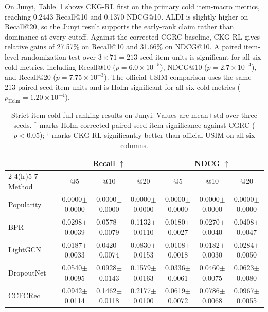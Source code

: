 \documentclass[sigconf,anonymous,review]{acmart}
\newcommand{\sd}[1]{{\footnotesize$\pm$#1}}
\begin{document}
On Junyi, Table~\ref{tab:junyi-cold} shows CKG-RL first on the primary cold item-macro metrics, reaching 0.2443 Recall@10 and 0.1370 NDCG@10. ALDI is slightly higher on Recall@20, so the Junyi result supports the early-rank claim rather than dominance at every cutoff. Against the corrected CGRC baseline, CKG-RL gives relative gains of 27.57\% on Recall@10 and 31.66\% on NDCG@10. A paired item-level randomization test over \(3\times 71=213\) seed-item units is significant for all six cold metrics, including Recall@10 (\(p=6.0{\times}10^{-5}\)), NDCG@10 (\(p=2.7{\times}10^{-4}\)), and Recall@20 (\(p=7.75{\times}10^{-3}\)). The official-USIM comparison uses the same 213 paired seed-item units and is Holm-significant for all six cold metrics (\(p_{\mathrm{Holm}}=1.20{\times}10^{-4}\)).

\begin{table}[t]
\centering
\caption{Strict item-cold full-ranking results on Junyi. Values are mean\(\pm\)std over three seeds. \(^{*}\) marks Holm-corrected paired seed-item significance against CGRC (\(p<0.05\)); \(^{\dagger}\) marks CKG-RL significantly better than official USIM on all six columns.}
\label{tab:junyi-cold}
\small
\setlength{\tabcolsep}{2.8pt}
\renewcommand{\arraystretch}{1.10}
\begin{tabular*}{\textwidth}{@{\extracolsep{\fill}}lcccccc}
\toprule
& \multicolumn{3}{c}{Recall \(\uparrow\)} & \multicolumn{3}{c}{NDCG \(\uparrow\)} \\
\cmidrule(lr){2-4}\cmidrule(lr){5-7}
Method & \multicolumn{1}{c}{@5} & \multicolumn{1}{c}{@10} & \multicolumn{1}{c}{@20} & \multicolumn{1}{c}{@5} & \multicolumn{1}{c}{@10} & \multicolumn{1}{c}{@20} \\
\midrule
Popularity & 0.0000\sd{0.0000} & 0.0000\sd{0.0000} & 0.0000\sd{0.0000} & 0.0000\sd{0.0000} & 0.0000\sd{0.0000} & 0.0000\sd{0.0000} \\
BPR~\cite{rendle2009bpr} & 0.0298\sd{0.0039} & 0.0578\sd{0.0079} & 0.1132\sd{0.0110} & 0.0180\sd{0.0027} & 0.0270\sd{0.0040} & 0.0408\sd{0.0047} \\
LightGCN~\cite{he2020lightgcn} & 0.0187\sd{0.0033} & 0.0420\sd{0.0074} & 0.0830\sd{0.0153} & 0.0108\sd{0.0018} & 0.0182\sd{0.0030} & 0.0284\sd{0.0050} \\
DropoutNet~\cite{volkovs2017dropoutnet} & 0.0540\sd{0.0095} & 0.0928\sd{0.0143} & 0.1579\sd{0.0163} & 0.0336\sd{0.0061} & 0.0460\sd{0.0075} & 0.0623\sd{0.0080} \\
CCFCRec~\cite{zhou2023ccfcrec} & 0.0942\sd{0.0114} & 0.1462\sd{0.0118} & 0.2177\sd{0.0100} & 0.0619\sd{0.0072} & 0.0786\sd{0.0068} & 0.0967\sd{0.0055} \\

\end{tabular*}
\end{table}
\end{document}
